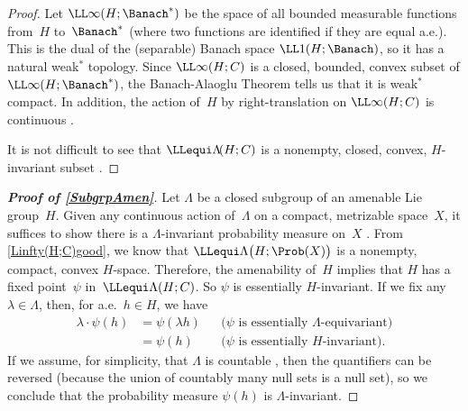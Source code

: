 \begin{proof}
Let $\LL\infty(H;\Banach^*)$ be the space of all bounded measurable functions from~$H$ to~$\Banach^*$ (where two functions are identified if they are equal a.e.). This is the dual of the (separable) Banach space $\LL1(H;\Banach)$, so it has a natural weak$^*$ topology. Since $\LL\infty(H; C)$ is a closed, bounded, convex subset of $\LL\infty(H;\Banach^*)$, the Banach-Alaoglu Theorem  tells us that it is weak$^*$ compact.
In addition, the action of~$H$ by right-translation on $\LL\infty(H; C)$ is continuous .

It is not difficult to see that $\LLequi\Lambda\!(H;C)$ is a nonempty, closed, convex, $H$-invariant subset .
\end{proof}

\begin{proof}[\bf Proof of \cref{SubgrpAmen}]
Let $\Lambda$ be a closed subgroup of an amenable Lie group~$H$.
Given any continuous action of~$\Lambda$ on a compact, metrizable space~$X$, it suffices to show there is a $\Lambda$-invariant probability measure on~$X$ .
From \cref{Linfty(H;C)good}, we know that $\LLequi\Lambda \bigl( H; \Prob(X) \bigr)$ is a nonempty, compact, convex $H$-space. Therefore, the amenability of~$H$ implies that $H$ has a fixed point~$\psi$ in~$\LLequi\Lambda (H;C)$. So $\psi$ is essentially $H$-invariant. If we fix any $\lambda \in \Lambda$, then, for a.e.\ $h \in H$, we have
	\begin{align*}
	\lambda \cdot \psi(h) 
	&= \psi(\lambda h) 
	&& \text{($\psi$ is essentially $\Lambda$-equivariant)} 
	\\&= \psi(h) 
	&& \text{($\psi$ is essentially $H$-invariant)} 
	. \end{align*}
If we assume, for simplicity, that $\Lambda$ is countable , then the quantifiers can be reversed (because the union of countably many null sets is a null set), so we conclude that the probability measure $\psi(h)$ is $\Lambda$-invariant.
\end{proof}

